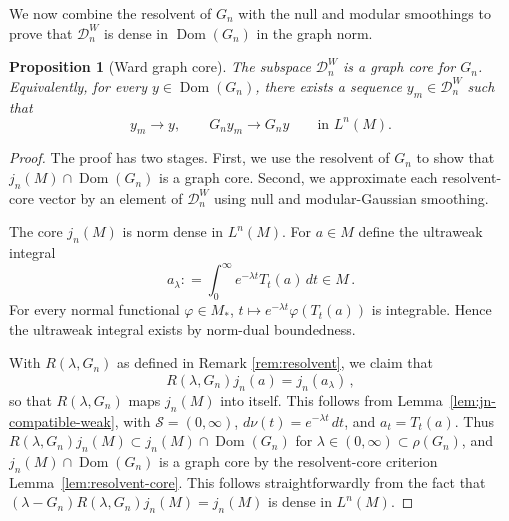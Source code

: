 \documentclass[11pt,a4paper]{article}
\theoremstyle{plain}
\numberwithin{theorem}{section}
\newtheorem{proposition}[theorem]{Proposition}
\theoremstyle{definition}
\newcommand{\?}{\overset{?}{=}}
\newcommand{\defeq}{\mathrel{\mathop:}=}
\newcommand{\I}{\infty}
\renewcommand{\l}{\lambda}	%
\renewcommand{\r}{\rho}		%
\newcommand{\cD}{\mathcal{D}}
\DeclareMathOperator{\Dom}{Dom}
\begin{document}
We now combine the resolvent of $G_n$ with the null and modular smoothings to prove that $\cD_n^{W}$ is dense in $\Dom(G_n)$ in the graph norm.
\begin{proposition}[Ward graph core]
\label{prop:ward-graph-core-fixed}
The subspace $\cD_n^{W}$ is a graph core for $G_n$.  Equivalently, for every $y\in\Dom(G_n)$, there exists a sequence $y_m\in\cD_n^{W}$ such that
\[
  y_m\longrightarrow y,
  \qquad
  G_ny_m\longrightarrow G_ny
  \qquad 
  \text{in }L^n(M).
\]
\end{proposition}

\begin{proof}
The proof has two stages.  First, we use the resolvent of $G_n$ to show that $j_n(M)\cap\Dom(G_n)$ is a graph core.  Second, we approximate each resolvent-core vector by an element of $\cD_n^{W}$ using null and modular-Gaussian smoothing.

The core $j_n(M)$ is norm dense in $L^n(M)$.  
For $a\in M$ define the ultraweak integral
\begin{equation*}
  a_\lambda\defeq \int_0^\infty e^{-\lambda t}T_t(a)\,dt\in M\,.
\end{equation*}
For every normal functional $\varphi \in M_*$, $t\mapsto e^{-\lambda t}\varphi(T_t(a))$ is integrable. Hence the ultraweak integral exists by norm-dual boundedness.

With $R(\l,G_n)$ as defined in Remark \ref{rem:resolvent}, we claim that
\begin{equation}\label{eq:rlambda-inclusion}
  R(\l,G_n)j_n(a)=j_n(a_\lambda)\,,
\end{equation}
so that $R(\l,G_n)$ maps $j_n(M)$ into itself. This follows from Lemma~\ref{lem:jn-compatible-weak}, with $\mathcal S= (0,\I)$, $d\nu(t) = e^{-\lambda t} \,dt$, and $a_t= T_t(a)$. 
Thus $R(\l,G_n)j_n(M)\subset j_n(M)\cap\Dom(G_n)$ for $\l\in(0,\I)\subset\r(G_n)$, and $j_n(M)\cap\Dom(G_n)$ is a graph core by the resolvent-core criterion Lemma~\ref{lem:resolvent-core}. This follows straightforwardly from the fact that $(\l-G_n)R(\l,G_n)j_n(M)=j_n(M)$ is dense in $L^n(M)$.


\end{proof}
\end{document}
